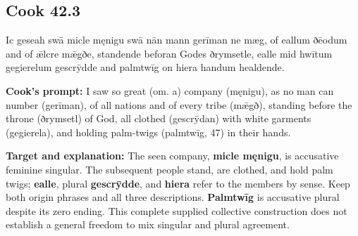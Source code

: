 \par\begin{minipage}{\linewidth}\raggedright
\subsection*{Cook 42.3}

Ic geseah swā micle męnigu swā nān mann gerīman ne mæg, of eallum ðēodum and of ǣlcre mǣgðe, standende beforan Godes ðrymsetle, ealle mid hwītum gegierelum gescrȳdde and palmtwīg on hiera handum healdende.

\textbf{Cook's prompt:} I saw so great (om. a) company (męnigu), as no man can number (gerīman), of all nations and of every tribe (mǣgð), standing before the throne (ðrymsetl) of God, all clothed (gescrȳdan) with white garments (gegierela), and holding palm-twigs (palmtwīg, 47) in their hands.

\textbf{Target and explanation:} The seen company, \textbf{micle męnigu}, is accusative feminine singular. The subsequent people stand, are clothed, and hold palm twigs; \textbf{ealle}, plural \textbf{gescrȳdde}, and \textbf{hiera} refer to the members by sense. Keep both origin phrases and all three descriptions. \textbf{Palmtwīg} is accusative plural despite its zero ending. This complete supplied collective construction does not establish a general freedom to mix singular and plural agreement.

\end{minipage}\par\addvspace{4pt}

